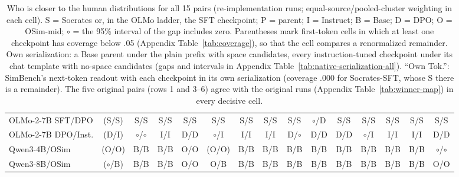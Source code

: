 \begin{table}[t]
\begin{tabular}{@{}lcccc@{\hspace{5pt}}ccc@{\hspace{5pt}}ccc@{\hspace{5pt}}ccc@{\hspace{5pt}}c@{}}
OLMo-2-7B SFT/DPO & (S/S) & S/S & S/S & S/S & S/S & S/S & S/S & S/S & $\circ$/D & S/S & S/S & S/S & S/S & S/S \\
OLMo-2-7B DPO/Inst. & (D/I) & $\circ$/$\circ$ & I/I & D/D & $\circ$/I & I/I & I/I & D/$\circ$ & D/D & D/D & $\circ$/I & I/I & I/I & D/D \\
\addlinespace[2pt]
Qwen3-4B/OSim & (O/O) & B/B & B/B & O/O & (O/O) & B/B & B/B & B/B & B/B & B/B & B/B & B/B & B/B & $\circ$/$\circ$ \\
Qwen3-8B/OSim & ($\circ$/B) & B/B & B/B & O/O & O/B & B/B & B/B & B/B & B/B & B/B & B/B & B/B & B/B & O/O \\
\bottomrule
\end{tabular}
\caption{Who is closer to the human distributions for all 15 pairs (re-implementation runs; equal-source/pooled-cluster weighting in each cell). S = Socrates or, in the OLMo ladder, the SFT checkpoint; P = parent; I = Instruct; B = Base; D = DPO; O = OSim-mid; $\circ$ = the 95\% interval of the gap includes zero. Parentheses mark first-token cells in which at least one checkpoint has coverage below .05 (Appendix Table~\ref{tab:coverage}), so that the cell compares a renormalized remainder. Own serialization: a Base parent under the plain prefix with space candidates, every instruction-tuned checkpoint under its chat template with no-space candidates (gaps and intervals in Appendix Table~\ref{tab:native-serialization-all}). ``Own Tok.'': SimBench's next-token readout with each checkpoint in its own serialization (coverage .000 for Socrates-SFT, whose S there is a remainder). The five original pairs (rows 1 and 3--6) agree with the original runs (Appendix Table~\ref{tab:winner-map}) in every decisive cell.}
\label{tab:winner-map-15}
\end{table}
